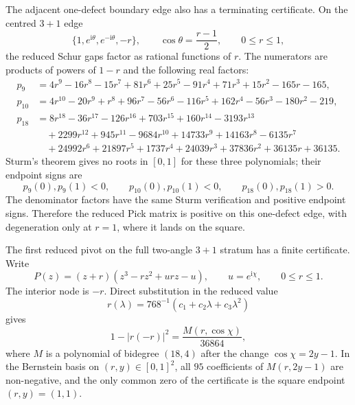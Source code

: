 \documentclass[11pt]{article}
\numberwithin{equation}{section}
\newcommand{\ii}{\mathrm i}
\begin{document}
The adjacent one-defect boundary edge also has a terminating certificate.  On
the centred \(3{+}1\) edge
\[
  \{1,e^{\ii\theta},e^{-\ii\theta},-r\},\qquad
  \cos\theta=\frac{r-1}{2},\qquad 0\le r\le1,
\]
the reduced Schur gaps factor as rational functions of \(r\).  The numerators
are products of powers of \(1-r\) and the following real factors:
\[
\begin{aligned}
p_9&=4r^9-16r^8-15r^7+81r^6+25r^5-91r^4+71r^3+15r^2-165r-165,\\
p_{10}&=4r^{10}-20r^9+r^8+96r^7-56r^6-116r^5+162r^4-56r^3-180r^2-219,\\
p_{18}&=8r^{18}-36r^{17}-126r^{16}+703r^{15}+160r^{14}-3193r^{13}\\
&\quad+2299r^{12}+945r^{11}-9684r^{10}+14733r^9+14163r^8-6135r^7\\
&\quad+24992r^6+21897r^5+1737r^4+24039r^3+37836r^2+36135r+36135 .
\end{aligned}
\]
Sturm's theorem gives no roots in \([0,1]\) for these three polynomials; their
endpoint signs are
\[
  p_9(0),p_9(1)<0,\qquad p_{10}(0),p_{10}(1)<0,\qquad
  p_{18}(0),p_{18}(1)>0 .
\]
The denominator factors have the same Sturm verification and positive endpoint
signs.  Therefore the reduced Pick matrix is positive on this one-defect edge,
with degeneration only at \(r=1\), where it lands on the square.

The first reduced pivot on the full two-angle \(3{+}1\) stratum has a finite
certificate.  Write
\[
  P(z)=(z+r)(z^3-rz^2+u r z-u),\qquad u=e^{\ii\chi},\qquad 0\le r\le1.
\]
The interior node is \(-r\).  Direct substitution in the reduced value
\[
  r(\lambda)=768^{-1}(c_1+c_2\lambda+c_3\lambda^2)
\]
gives
\[
  1-|r(-r)|^2=\frac{M(r,\cos\chi)}{36864},
\]
where \(M\) is a polynomial of bidegree \((18,4)\) after the change
\(\cos\chi=2y-1\).  In the Bernstein basis on
\((r,y)\in[0,1]^2\), all \(95\) coefficients of \(M(r,2y-1)\) are
non-negative, and the only common zero of the certificate is the square
endpoint \((r,y)=(1,1)\).
\end{document}
